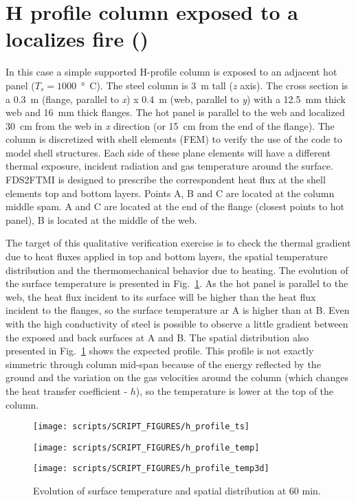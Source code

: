 \documentclass[11pt]{book}
\begin{document}
\section{H profile column exposed to a localizes fire (\texorpdfstring{}{h\_profile})}

In this case a simple supported H-profile column is exposed to an adjacent hot panel ($T_s=1000$~\si{\degree C}). The steel column is 3~m tall (\textit{z} axis). The cross section is a 0.3~m (flange, parallel to \textit{x}) x 0.4~m (web, parallel to \textit{y}) with a 12.5~mm thick web and 16~mm thick flanges. The hot panel is parallel to the web and localized 30~cm from the web in \textit{x} direction (or 15~cm from the end of the flange).
The column is discretized with shell elements (FEM) to verify the use of the code to model shell structures. Each side of these plane elements will have a different thermal exposure, incident radiation and gas temperature around the surface. FDS2FTMI is designed to prescribe the correspondent heat flux at the shell elements top and bottom layers. Points A, B and C are located at the column middle spam. A and C are located at the end of the flange (closest points to hot panel), B is located at the middle of the web.

The target of this qualitative verification exercise is to check the thermal gradient due to heat fluxes applied in top and bottom layers, the spatial temperature distribution and the thermomechanical behavior due to heating. The evolution of the surface temperature is presented in Fig.~\ref{h_profile1}. As the hot panel is parallel to the web, the heat flux incident to its surface will be higher than the heat flux incident to the flanges, so the surface temperature ar A is higher than at B. Even with the high conductivity of steel is possible to observe a little gradient between the exposed and back surfaces at A and B. The spatial distribution also presented in Fig.~\ref{h_profile1} shows the expected profile. This profile is not exactly simmetric through column mid-span because of the energy reflected by the ground and the variation on the gas velocities around the column (which changes the heat transfer coefficient - $h$), so the temperature is lower at the top of the column.

\begin{figure}[ht]
\noindent
\parbox[c]{22em}{\texttt{[image: scripts/SCRIPT\_FIGURES/h\_profile\_ts]}} 
\parbox[c]{11em}{\texttt{[image: scripts/SCRIPT\_FIGURES/h\_profile\_temp]}} 
\parbox[c]{1em}{\texttt{[image: scripts/SCRIPT\_FIGURES/h\_profile\_temp3d]}} 
\caption[The  results]{Evolution of surface temperature and spatial distribution at 60 min.}
\label{h_profile1}
\end{figure}
\end{document}
